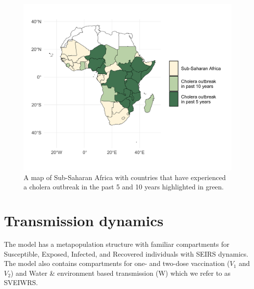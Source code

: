 \documentclass[
]{book}
\begin{document}
\begin{figure}

{\centering \includegraphics[width=1\linewidth]{figures/africa_map} 

}

\caption{A map of Sub-Saharan Africa with countries that have experienced a cholera outbreak in the past 5 and 10 years highlighted in green.}\label{fig:map}
\end{figure}

\section{Transmission dynamics}\label{transmission-dynamics}

The model has a metapopulation structure with familiar compartments for Susceptible, Exposed, Infected, and Recovered individuals with SEIRS dynamics. The model also contains compartments for one- and two-dose vaccination (\(V_1\) and \(V_2\)) and Water \& environment based transmission (W) which we refer to as SVEIWRS.
\end{document}
